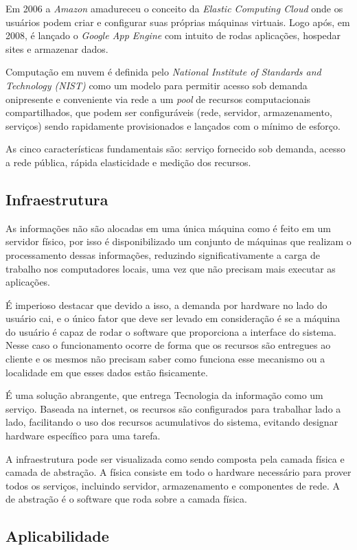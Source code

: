 \documentclass[12pt]{article}
\begin{document}
Em 2006 a \emph{Amazon} amadureceu o conceito da \emph{Elastic Computing Cloud} onde os usuários podem criar e configurar suas próprias máquinas virtuais. Logo após, em 2008, é lançado o \emph{Google App Engine} com intuito de rodas aplicações, hospedar sites e armazenar dados.

Computação em nuvem é definida pelo \emph{National Institute of Standards and Technology (NIST)} como um modelo para permitir acesso sob demanda onipresente e conveniente via rede a um \emph{pool} de recursos computacionais compartilhados, que podem ser configuráveis (rede, servidor, armazenamento, serviços) sendo rapidamente provisionados e lançados com o mínimo de esforço.

As cinco características fundamentais são: serviço fornecido sob demanda, acesso a rede pública, rápida elasticidade e medição dos recursos.
\subsection{Infraestrutura}

As informações não são alocadas em uma única máquina como é feito em um servidor físico, por isso é disponibilizado um conjunto de máquinas que realizam o processamento dessas informações, reduzindo significativamente a carga de trabalho nos computadores locais, uma vez que não precisam mais executar as aplicações.

É imperioso destacar que devido a isso, a demanda por hardware no lado do usuário cai, e o único fator que deve ser levado em consideração é se a máquina do usuário é capaz de rodar o software que proporciona a interface do sistema. Nesse caso o funcionamento ocorre de forma que os recursos são entregues ao cliente e os mesmos não precisam saber como funciona esse mecanismo ou a localidade em que esses dados estão fisicamente.

É uma solução abrangente, que entrega Tecnologia da informação como um serviço. Baseada na internet, os recursos são configurados para trabalhar lado a lado, facilitando o uso dos recursos acumulativos do sistema, evitando designar hardware específico para uma tarefa.

A infraestrutura pode ser visualizada como sendo composta pela camada física e camada de abstração. A física consiste em todo o hardware necessário para prover todos os serviços, incluindo servidor, armazenamento e componentes de rede. A de abstração é o software que roda sobre a camada física.

\subsection{Aplicabilidade}
\end{document}

